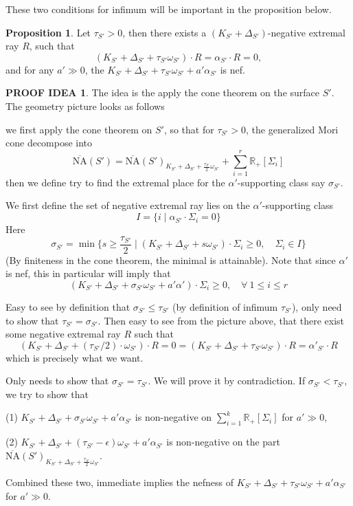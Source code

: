 \documentclass[11pt]{article}
\theoremstyle{definition}
\newtheorem{proposition}[theorem]{Proposition}
\newtheorem{proofidea}[theorem]{PROOF IDEA}
\begin{document}
	These two conditions for infimum will be important in the proposition below.
	\begin{proposition}\label{nefonS}
		Let $\tau_{S'}>0$, then there exists a $(K_{S'}+ \Delta_{S'})$-negative extremal ray $R$, such that $$(K_{S'}+ \Delta_{S'}+ \tau_{S'} \omega_{S'})\cdot R = \alpha_{S'}\cdot R = 0,$$
		and for any $a'\gg 0$, the $K_{S'}+ \Delta_{S'} + \tau_{S'} \omega_{S'} + a' \alpha_{S'}$ is nef.
	\end{proposition}
	\begin{proofidea}
		The idea is the apply the cone theorem on the surface $S'$. The geometry picture looks as follows
		
		
		we first apply the cone theorem on $S'$, so that for $\tau_{S'}>0$, the generalized Mori cone decompose into $$\overline{\text{NA}}(S') = \overline{\text{NA}}(S')_{K_{S'}+ \Delta_{S'} + \frac{\tau_{S'}}{2} \omega_{S'}} + \sum _{i =1}^r  \mathbb{R}_+ [\Sigma_i]$$then we define try to find the extremal place for the $\alpha'$-supporting class say $\sigma_{S'}$.
		
		We first define the set of negative extremal ray lies on the $\alpha'$-supporting class $$I = \{i \mid \alpha_{S'} \cdot \Sigma_i =  0 \} $$
		Here $$\sigma_{S'} = \min \{s\ge \frac{\tau_{S'}}{2}\mid (K_{S'}+\Delta_{S'} + s \omega_{S'})\cdot \Sigma_i \ge 0, \quad \Sigma _i  \in I\}$$(By finiteness in the cone theorem, the minimal is attainable). Note that since $\alpha'$ is nef, this in particular will imply that $$(K_{S'}+ \Delta_{S'}+ \sigma_{S'} \omega_{S'} + a' \alpha') \cdot \Sigma_i  \ge 0  ,\quad \forall\ 1\le i\le r$$
		
		Easy to see by definition that $\sigma_{S'} \le \tau_{S'}$ (by definition of infimum $\tau_{S'}$), only need to show that $\tau_{S'} = \sigma_{S'}$. Then easy to see from the picture above, that there exist some negative extremal ray $R$ such that $$(K_{S'}+ \Delta_{S' }+ (\tau_{S'}/2) \cdot  \omega _{S'}) \cdot R = 0 = (K_{S'} + \Delta_{S'} + \tau_{S'}  \omega_{S'})\cdot R = \alpha'_{S'} \cdot R$$which is precisely what we want. 
		
		Only needs to show that $\sigma_{S'} = \tau_{S'}$. We will prove it by contradiction. If $\sigma_{S'}< \tau_{S'}$, we try to show that 
		
		(1) $K_{S'}+ \Delta_{S'}+ \sigma_{S'}\omega_{S'}+ a' \alpha_{S'}$ is non-negative on $\sum_{i=1}^k \mathbb{R}_+ [\Sigma_i]$ for $a'\gg 0$,
		
		(2) $K_{S'} + \Delta_{S'} + (\tau_{S'} - \epsilon)\omega_{S'} + a' \alpha_{S'}$ is non-negative on the part $\overline{\text{NA}}(S')_{K_{S'}+ \Delta_{S'} + \frac{\tau_{S'}}{2} \omega_{S'}}$.
		
		Combined these two, immediate implies the nefness of $K_{S'}+ \Delta_{S'} + \tau_{S'} \omega _{S'} + a' \alpha_{S'}$ for $a' \gg 0$.
		
		
	\end{proofidea}
\end{document}
